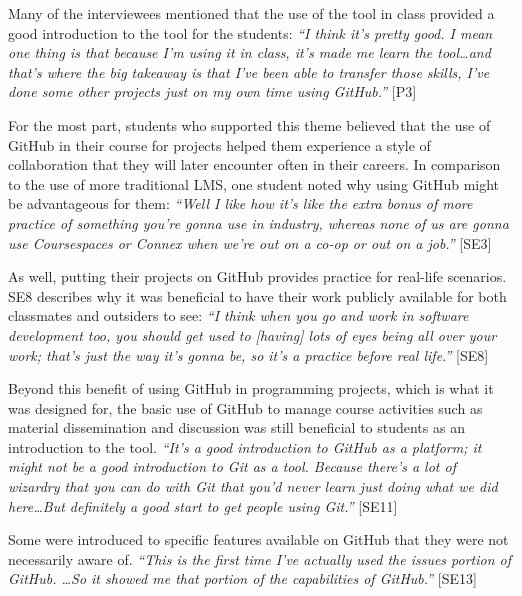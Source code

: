 Many of the interviewees mentioned that the use of the tool in class provided a good introduction to the tool for the students: \textit{``I think it's pretty good. I mean one thing is that because I'm using it in class, it's made me learn the tool\ldots and that's where the big takeaway is that I've been able to transfer those skills, I've done some other projects just on my own time using GitHub.''} [P3]


For the most part, students who supported this theme believed that the use of GitHub in their course for projects helped them experience a style of collaboration that they will later encounter often in their careers. In comparison to the use of more traditional LMS, one student noted why using GitHub might be advantageous for them: \textit{``Well I like how it's like the extra bonus of more practice of something you're gonna use in industry, whereas none of us are gonna use Coursespaces or Connex when we're out on a co-op or out on a job.''} [SE3]

As well, putting their projects on GitHub provides practice for real-life scenarios. SE8 describes why it was beneficial to have their work publicly available for both classmates and outsiders to see: \textit{``I think when you go and work in software development too, you should get used to [having] lots of eyes being all over your work; that's just the way it's gonna be, so it's a practice before real life.''} [SE8]

Beyond this benefit of using GitHub in programming projects, which is what it was designed for, the basic use of GitHub to manage course activities such as material dissemination and discussion was still beneficial to students as an introduction to the tool. \textit{``It's a good introduction to GitHub as a platform; it might not be a good introduction to Git as a tool. Because there's a lot of wizardry that you can do with Git that you'd never learn just doing what we did here\ldots But definitely a good start to get people using Git.''} [SE11]

Some were introduced to specific features available on GitHub that they were not necessarily aware of. \textit{``This is the first time I've actually used the issues portion of GitHub. \ldots So it showed me that portion of the capabilities of GitHub.''} [SE13]

